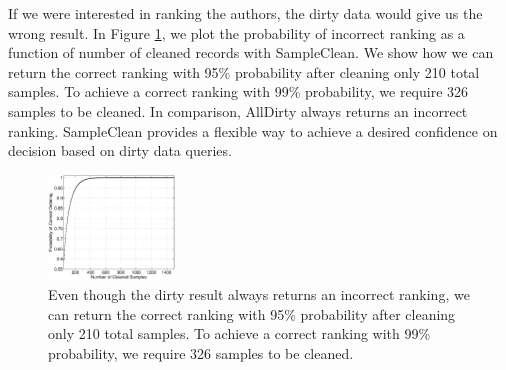 If we were interested in ranking the authors, the dirty data would give us the wrong result. 
In Figure \ref{exp:ms-academic-ranking}, we plot the probability of incorrect  ranking as a function of number of cleaned records with SampleClean.
We show how we can return the correct ranking with 95\% probability after cleaning only 210 total samples.
To achieve a correct ranking with 99\% probability, we require 326 samples to be cleaned.
In comparison, AllDirty always returns an incorrect ranking.
SampleClean provides a flexible way to achieve a desired confidence on decision based on dirty data queries.

\begin{figure}
\includegraphics[width=0.3\textwidth]{figs/msacademic-paper-ranking.eps}
\caption{Even though the dirty result always returns an incorrect ranking, we can return the correct ranking with 95\% probability after cleaning only 210 total samples. To achieve a correct ranking with 99\% probability, we require 326 samples to be cleaned.\label{exp:ms-academic-ranking} }

\end{figure}


